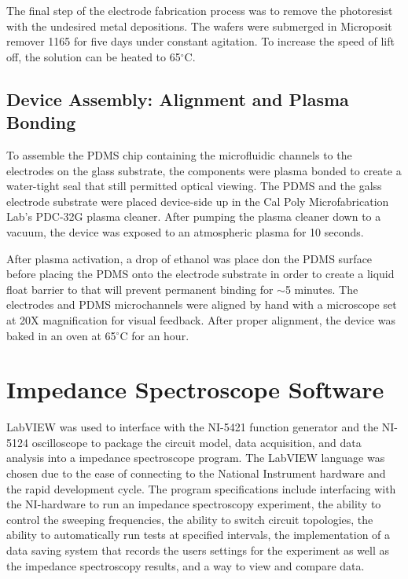 The final step of the electrode fabrication process was to remove the photoresist with the undesired metal depositions. The wafers were submerged in Microposit remover 1165 for five days under constant agitation. To increase the speed of lift off, the solution can be heated to 65$^\circ$C.

\subsection{Device Assembly: Alignment and Plasma Bonding}
\par To assemble the PDMS chip containing the microfluidic channels to the electrodes on the glass substrate, the components were plasma bonded to create a water-tight seal that still permitted optical viewing. The PDMS and the galss electrode substrate were placed device-side up in the Cal Poly Microfabrication Lab's PDC-32G plasma cleaner. After pumping the plasma cleaner down to a vacuum, the device was exposed to an atmospheric plasma for 10 seconds.  

\par After plasma activation, a drop of ethanol was place don the PDMS surface before placing the PDMS onto the electrode substrate in order to create a liquid float barrier to that will prevent permanent binding for $\sim$5 minutes. The electrodes and PDMS microchannels were aligned by hand with a microscope set at 20X magnification for visual feedback. After proper alignment, the device was baked in an oven at 65$^\circ$C for an hour. 





\section[IS Software]{Impedance Spectroscope Software}
\par LabVIEW was used to interface with the NI-5421 function generator and the NI-5124 oscilloscope to package the circuit model, data acquisition, and data analysis into a impedance spectroscope program. The LabVIEW language was chosen due to the ease of connecting to the National Instrument hardware and the rapid development cycle. The program specifications include interfacing with the NI-hardware to run an impedance spectroscopy experiment, the ability to control the sweeping frequencies, the ability to switch circuit topologies, the ability to automatically run tests at specified intervals, the implementation of a data saving system that records the users settings for the experiment as well as the impedance spectroscopy results, and a way to view and compare data.

